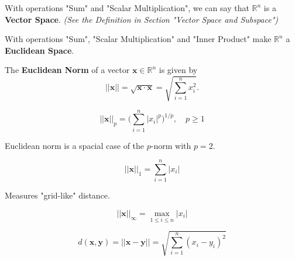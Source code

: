 \begin{remark*}
    With operations "Sum" and "Scalar Multiplication", we can say that $\mathbb{R}^{n}$ is a \textbf{Vector Space}. \textit{(See the Definition in Section "Vector Space and Subspace")}
\end{remark*}

\begin{remark*}
    With operations "Sum", "Scalar Multiplication" and "Inner Product" make $\mathbb{R}^{n}$ a \textbf{Euclidean Space}.
\end{remark*}

\begin{definition}
    The \textbf{Euclidean Norm} of a vector $\mathbf{x} \in \mathbb{R}^{n}$ is given by \begin{equation*}
        ||\mathbf{x}||=\sqrt{\mathbf{x}\cdot \mathbf{x}} = \sqrt{\sum_{i=1}^{n} x^2_{i}}.
    \end{equation*}
\end{definition}

\begin{definition}[$p$-Norm*]
    \begin{equation*}
        ||\mathbf{x}||_p = \Big(\sum_{i=1}^{n} |x_i|^p\Big)^{1/p}, \quad p \geq 1
    \end{equation*}
    \begin{remark*}
        Euclidean norm is a spacial case of the $p$-norm with $p=2$.
    \end{remark*}

\end{definition}


\begin{definition}
    \begin{equation*}
        ||\mathbf{x}||_1 = \sum_{i=1}^{n} |x_i|
    \end{equation*}
    \begin{remark*}
        Measures "grid-like" distance.
    \end{remark*}
\end{definition}

\begin{definition}
    \begin{equation*}
        ||\mathbf{x}||_{\infty } = \max_{1 \leq i \leq n} |x_i|
    \end{equation*}
\end{definition}

\begin{definition}
    \begin{equation*}
        d(\mathbf{x},\mathbf{y}) = ||\mathbf{x}-\mathbf{y}|| = \sqrt{\sum_{i=1}^{n} (x_i-y_i)^{2}}
    \end{equation*}
\end{definition}



